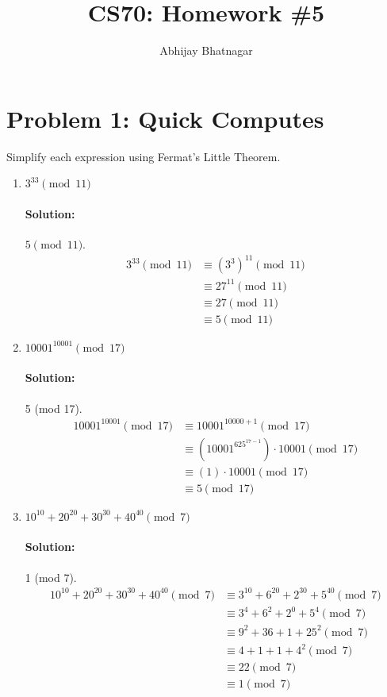 \documentclass[11pt, notitlepage]{report}
\makeatletter
\newcommand{\Question}[1]{\newpage\section{#1}}
\newenvironment{solution}{\paragraph{Solution:}}{\hfill}
\newcommand*{\toccontents}{\@starttoc{toc}}
\makeatother
\begin{document}
   \title{CS70: Homework \#5}
   \author{Abhijay Bhatnagar}
   \maketitle
   \toccontents



\setcounter{secnumdepth}{0} %

\Question{Problem 1: Quick Computes}
Simplify each expression using Fermat's Little Theorem. 
\begin{enumerate}[label=(\alph*)]
  \item $3^{33} \pmod{11}$
	\begin{solution} $5\pmod{11}$.
	\begin{align*}
		3^{33} \pmod{11}&\equiv (3^3)^{11} \pmod{11} \\
		&\equiv 27^{11} \pmod{11} \\
		&\equiv 27\pmod{11} \\
		&\equiv 5\pmod{11}
	\end{align*}
	\end{solution}
  \item $10001^{10001} \pmod{17}$
	\begin{solution} 5 (mod 17).
	\begin{align*}
		10001^{10001} \pmod{17} &\equiv 10001^{10000 + 1} \pmod{17} \\
		&\equiv (10001^{625^{17-1}})\cdot 10001 \pmod{17} \\
		&\equiv (1)\cdot 10001 \pmod{17} \\
		&\equiv 5 \pmod{17} 
	\end{align*}
		
	\end{solution}
  \item $10^{10} + 20^{20} + 30^{30} + 40^{40} \pmod{7}$
  \begin{solution}1 (mod 7).
  	\begin{align*}
  		10^{10} + 20^{20} + 30^{30} + 40^{40} \pmod{7} &\equiv 3^{10} + 6^{20} + 2^{30} + 5^{40} \pmod{7} \\
  		&\equiv 3^{4} + 6^{2} + 2^{0} + 5^{4} \pmod{7} \\
  		&\equiv 9^2 + 36 + 1 + 25^{2} \pmod{7} \\
  		&\equiv 4 + 1 + 1 + 4^{2} \pmod{7} \\
  		&\equiv 22 \pmod{7} \\
  		&\equiv 1 \pmod{7} \\
  	\end{align*}
  \end{solution}
\end{enumerate}
\end{document}
